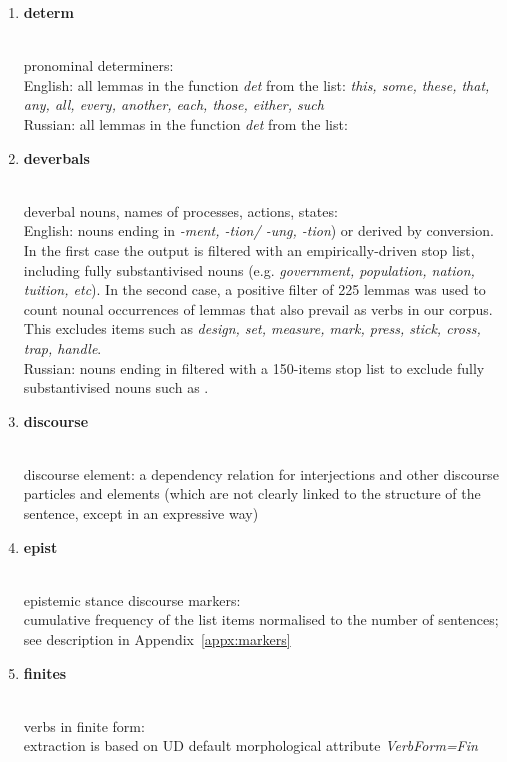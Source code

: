 \begin{enumerate}
	\item \hypertarget{ft:determ}{\textbf{determ}} \\
		pronominal determiners: \\
		English: all lemmas in the function \textit{det} from the list: \textit{this, some, these, that, any, all, every, another, each, those, either, such} \\
		Russian: all lemmas in the function \textit{det} from the list: 
	
	\item \hypertarget{ft:deverbals}{\textbf{deverbals}} \\
		deverbal nouns, names of processes, actions, states: \\
		English: nouns ending in \textit{-ment, -tion/ -ung, -tion}) or derived by conversion. In the first case the output is filtered with an empirically-driven stop list, including fully substantivised nouns (e.g. \textit{government, population, nation, tuition, etc}). In the second case, a positive filter of 225 lemmas was used to count nounal occurrences of lemmas that also prevail as verbs in our corpus. This excludes items such as \textit{design, set, measure, mark, press, stick, cross, trap, handle}. \\
		Russian: nouns ending in  filtered with a 150-items stop list to exclude fully substantivised nouns such as .
		
	\item \hypertarget{ft:discourse}{\textbf{discourse}} \\
		discourse element:
		a dependency relation for interjections and other discourse particles and elements (which are not clearly linked to the structure of the sentence, except in an expressive way)
		
	\item \hypertarget{ft:epist}{\textbf{epist}} \\
		epistemic stance discourse markers: \\
		cumulative frequency of the list items normalised to the number of sentences; see description in Appendix~\ref{appx:markers}
	
	\item \hypertarget{ft:finites}{\textbf{finites}} \\
		verbs in finite form: \\
		extraction is based on UD default morphological attribute \textit{VerbForm=Fin}
	

\end{enumerate}
